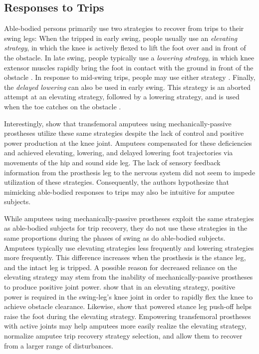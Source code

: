 \subsection{Responses to Trips}

Able-bodied persons primarily use two strategies to recover from trips to their
swing legs: When the tripped in early swing, people usually use an
\emph{elevating strategy}, in which the knee is actively flexed to lift the foot
over and in front of the obstacle. In late swing, people typically use a
\emph{lowering strategy}, in which knee extensor muscles rapidly bring the foot
in contact with the ground in front of the obstacle \citep{eng1994strategies}.
In response to mid-swing trips, people may use either strategy
\citep{schillings2000muscular}. Finally, the \emph{delayed lowering} can also be
used in early swing. This strategy is an aborted attempt at an elevating
strategy, followed by a lowering strategy, and is used when the toe catches
on the obstacle \citep{eng1994strategies}.

Interestingly, \citet{shirota2015transfemoral} show that transfemoral amputees
using mechanically-passive prostheses utilize these same strategies despite the
lack of control and positive power production at the knee joint. Amputees
compensated for these deficiencies and achieved elevating, lowering, and delayed
lowering foot trajectories via movements of the hip and sound side leg. The lack
of sensory feedback information from the prosthesis leg to the nervous system
did not seem to impede utilization of these strategies.  Consequently, the
authors hypothesize that mimicking able-bodied responses to trips may also be
intuitive for amputee subjects. 

While amputees using mechanically-passive prostheses exploit the same strategies
as able-bodied subjects for trip recovery, they do not use these strategies in
the same proportions during the phases of swing as do able-bodied subjects.
Amputees typically use elevating strategies less frequently and lowering
strategies more frequently. This difference increases when the prosthesis is the
stance leg, and the intact leg is tripped. A possible reason for decreased
reliance on the elevating strategy may stem from the inability of
mechanically-passive prostheses to produce positive joint power.
\citet{cordero2005energy} show that in an elevating strategy, positive power is
required in the swing-leg's knee joint in order to rapidly flex the knee to
achieve obstacle clearance. Likewise, \citet{pijnappels2004contribution} show
that powered stance leg push-off helps raise the foot during the elevating
strategy. Empowering transfemoral prostheses with active joints may help
amputees more easily realize the elevating strategy, normalize amputee trip
recovery strategy selection, and allow them to recover from a larger range of
disturbances.

